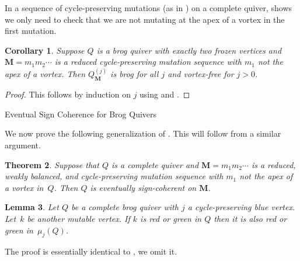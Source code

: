 \documentclass[12pt]{amsart}
\makeatletter
\newcommand{\cS}[1]{{\noindent\textsf{\color{purple}$\blacksquare$~#1~$\blacksquare$}}}
\newtheorem{thm}{Theorem}[section]
\newtheorem{cor}[thm]{Corollary}
\newtheorem{lem}[thm]{Lemma}
\theoremstyle{definition}
\theoremstyle{remark}
\numberwithin{equation}{section}
\def\subsection{\@startsection{subsection}{3}%
  \z@{.5\linespacing\@plus.7\linespacing}{.1\linespacing}%
  {\bfseries}}
\makeatother
\begin{document}
In a sequence of cycle-preserving mutations (as in ) on a complete quiver,  shows we only need to check that we are not mutating at the apex of a vortex in the first mutation.

\begin{cor}
\label{cor: brog forever}
Suppose $Q$ is a brog quiver with exactly two frozen vertices and $\mathbf M = m_1 m_2\cdots$ is a reduced cycle-preserving mutation sequence with $m_1$ not the apex of a vortex.
Then $Q_{\mathbf M}^{(j)}$ is brog for all $j$ and vortex-free for $j>0$.
\end{cor}

\begin{proof}
This follows by induction on $j$ using  and . 
\end{proof}


\subsection{Eventual Sign Coherence for Brog Quivers}

We now prove the following generalization of .
This will follow from a similar argument. 

\begin{thm}
\label{thm: brog coherence}
Suppose that $Q$ is a complete quiver and $\mathbf M = m_1 m_2 \cdots$ is a reduced, weakly balanced, and cycle-preserving mutation sequence with $m_1$ not the apex of a vortex in~$Q$.
Then $Q$ is eventually sign-coherent on $\mathbf M$.
\end{thm}

\begin{lem}
\label{lem: brog colors stay}
Let $Q$ be a complete brog quiver with $j$ a cycle-preserving blue vertex.
Let~$k$ be another mutable vertex. 
If $k$ is red or green in $Q$ then it is also red or green in~$\mu_j(Q)$.
\end{lem}

The proof is essentially identical to , we omit it.
\end{document}
